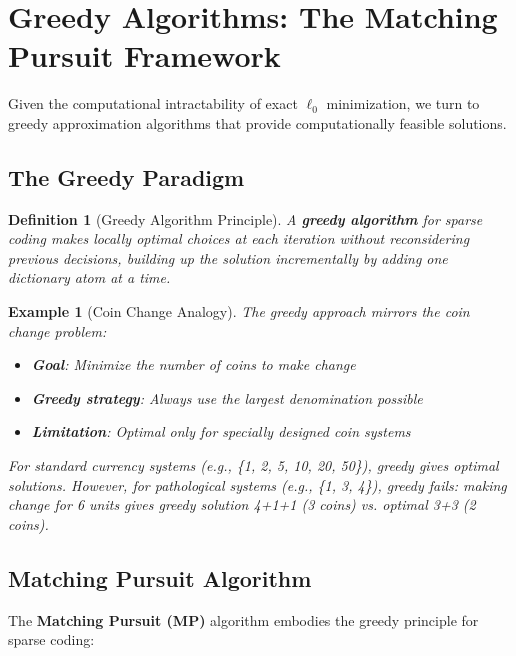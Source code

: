 \documentclass[12pt]{article}
\newtheorem{definition}[theorem]{Definition}
\newtheorem{example}[theorem]{Example}
\begin{document}
\newpage

\section{Greedy Algorithms: The Matching Pursuit Framework}

Given the computational intractability of exact $\ell_0$ minimization, we turn to greedy approximation algorithms that provide computationally feasible solutions.

\subsection{The Greedy Paradigm}

\begin{definition}[Greedy Algorithm Principle]\label{def:greedy_principle}
    A \textbf{greedy algorithm} for sparse coding makes locally optimal choices at each iteration without reconsidering previous decisions, building up the solution incrementally by adding one dictionary atom at a time.
\end{definition}

\begin{example}[Coin Change Analogy]\label{ex:coin_change}
    The greedy approach mirrors the coin change problem:
    \begin{itemize}
        \item \textbf{Goal}: Minimize the number of coins to make change
        \item \textbf{Greedy strategy}: Always use the largest denomination possible
        \item \textbf{Limitation}: Optimal only for specially designed coin systems
    \end{itemize}

    For standard currency systems (e.g., \{1, 2, 5, 10, 20, 50\}), greedy gives optimal solutions. However, for pathological systems (e.g., \{1, 3, 4\}), greedy fails: making change for 6 units gives greedy solution 4+1+1 (3 coins) vs. optimal 3+3 (2 coins).
\end{example}

\subsection{Matching Pursuit Algorithm}

The \textbf{Matching Pursuit (MP)} algorithm embodies the greedy principle for sparse coding:
\end{document}
